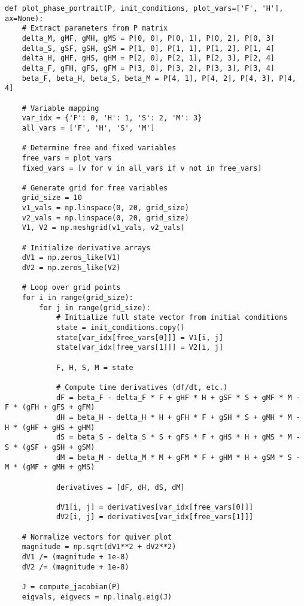 \documentclass[11pt]{article}
\begin{document}
\begin{Verbatim}[frame=single]
def plot_phase_portrait(P, init_conditions, plot_vars=['F', 'H'], ax=None):
    # Extract parameters from P matrix
    delta_M, gMF, gMH, gMS = P[0, 0], P[0, 1], P[0, 2], P[0, 3]
    delta_S, gSF, gSH, gSM = P[1, 0], P[1, 1], P[1, 2], P[1, 4]
    delta_H, gHF, gHS, gHM = P[2, 0], P[2, 1], P[2, 3], P[2, 4]
    delta_F, gFH, gFS, gFM = P[3, 0], P[3, 2], P[3, 3], P[3, 4]
    beta_F, beta_H, beta_S, beta_M = P[4, 1], P[4, 2], P[4, 3], P[4, 4]

    # Variable mapping
    var_idx = {'F': 0, 'H': 1, 'S': 2, 'M': 3}
    all_vars = ['F', 'H', 'S', 'M']

    # Determine free and fixed variables
    free_vars = plot_vars
    fixed_vars = [v for v in all_vars if v not in free_vars]

    # Generate grid for free variables
    grid_size = 10
    v1_vals = np.linspace(0, 20, grid_size)
    v2_vals = np.linspace(0, 20, grid_size)
    V1, V2 = np.meshgrid(v1_vals, v2_vals)

    # Initialize derivative arrays
    dV1 = np.zeros_like(V1)
    dV2 = np.zeros_like(V2)

    # Loop over grid points
    for i in range(grid_size):
        for j in range(grid_size):
            # Initialize full state vector from initial conditions
            state = init_conditions.copy()
            state[var_idx[free_vars[0]]] = V1[i, j]
            state[var_idx[free_vars[1]]] = V2[i, j]

            F, H, S, M = state

            # Compute time derivatives (df/dt, etc.)
            dF = beta_F - delta_F * F + gHF * H + gSF * S + gMF * M - F * (gFH + gFS + gFM)
            dH = beta_H - delta_H * H + gFH * F + gSH * S + gMH * M - H * (gHF + gHS + gHM)
            dS = beta_S - delta_S * S + gFS * F + gHS * H + gMS * M - S * (gSF + gSH + gSM)
            dM = beta_M - delta_M * M + gFM * F + gHM * H + gSM * S - M * (gMF + gMH + gMS)

            derivatives = [dF, dH, dS, dM]

            dV1[i, j] = derivatives[var_idx[free_vars[0]]]
            dV2[i, j] = derivatives[var_idx[free_vars[1]]]

    # Normalize vectors for quiver plot
    magnitude = np.sqrt(dV1**2 + dV2**2)
    dV1 /= (magnitude + 1e-8)
    dV2 /= (magnitude + 1e-8)

    J = compute_jacobian(P)
    eigvals, eigvecs = np.linalg.eig(J)


\end{Verbatim}
\end{document}
